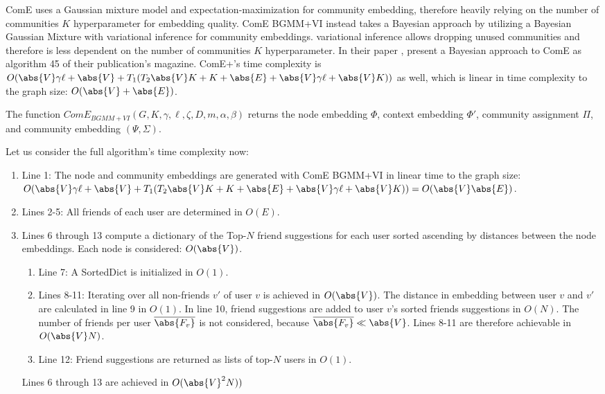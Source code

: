 \documentclass[conference]{IEEEtran}
\begin{document}
ComE uses a Gaussian mixture model and expectation-maximization for community embedding, therefore heavily relying on the number of communities $K$ hyperparameter for embedding quality. ComE BGMM+VI instead takes a Bayesian approach by utilizing a Bayesian Gaussian Mixture with variational inference for community embeddings. variational inference allows dropping unused communities and therefore is less dependent on the number of communities $K$ hyperparameter. In their paper , \citeauthor{ComE+} present a Bayesian approach to ComE as algorithm 45 of their publication's magazine. ComE+'s time complexity is $O(\abs{V}\gamma\ell + \abs{V} + T_1 (T_2\abs{V}K + K + \abs{E} + \abs{V}\gamma\ell + \abs{V}K))$ as well, which is linear in time complexity to the graph size: $O(\abs{V} + \abs{E})$.\cite{ComE+}

The function $ComE_{BGMM+VI}(G, K, \gamma, \ell, \zeta, D, m, \alpha, \beta)$ returns the node embedding $\Phi$, context embedding $\Phi'$, community assignment $\Pi$, and community embedding $(\Psi,\Sigma)$.

Let us consider the full algorithm's time complexity now:
\begin{enumerate}
    \item Line 1: The node and community embeddings are generated with ComE BGMM+VI in linear time to the graph size: $O(\abs{V}\gamma\ell + \abs{V} + T_1 (T_2\abs{V}K + K + \abs{E} + \abs{V}\gamma\ell + \abs{V}K)) = O(\abs{V}\abs{E})$.
    \item Lines 2-5: All friends of each user are determined in $O(E)$.
    \item Lines 6 through 13 compute a dictionary of the Top-$N$ friend suggestions for each user sorted ascending by distances between the node embeddings. Each node is considered: $O(\abs{V})$.
          \begin{enumerate}
              \item Line 7: A SortedDict is initialized in $O(1)$.
              \item Lines 8-11: Iterating over all non-friends $v'$ of user $v$ is achieved in $O(\abs{V})$. The distance in embedding between user $v$ and $v'$ are calculated in line 9 in $O(1)$. In line 10, friend suggestions are added to user $v$'s sorted friends suggestions in $O(N)$. The number of friends per user $\overline{\abs{F_v}}$ is not considered, because $\overline{\abs{F_v}} \ll \abs{V}$. Lines 8-11 are therefore achievable in $O(\abs{V}N)$.
              \item Line 12: Friend suggestions are returned as lists of top-$N$ users in $O(1)$.
          \end{enumerate}
          Lines 6 through 13 are achieved in $O(\abs{V}^2N))$
\end{enumerate}
\end{document}
